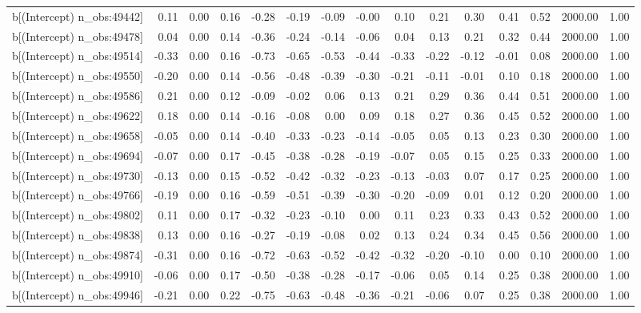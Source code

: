 \begin{table}[ht]
\begin{tabular}{rrrrrrrrrrrrrrr}
  b[(Intercept) n\_obs:49442] & 0.11 & 0.00 & 0.16 & -0.28 & -0.19 & -0.09 & -0.00 & 0.10 & 0.21 & 0.30 & 0.41 & 0.52 & 2000.00 & 1.00 \\ 
  b[(Intercept) n\_obs:49478] & 0.04 & 0.00 & 0.14 & -0.36 & -0.24 & -0.14 & -0.06 & 0.04 & 0.13 & 0.21 & 0.32 & 0.44 & 2000.00 & 1.00 \\ 
  b[(Intercept) n\_obs:49514] & -0.33 & 0.00 & 0.16 & -0.73 & -0.65 & -0.53 & -0.44 & -0.33 & -0.22 & -0.12 & -0.01 & 0.08 & 2000.00 & 1.00 \\ 
  b[(Intercept) n\_obs:49550] & -0.20 & 0.00 & 0.14 & -0.56 & -0.48 & -0.39 & -0.30 & -0.21 & -0.11 & -0.01 & 0.10 & 0.18 & 2000.00 & 1.00 \\ 
  b[(Intercept) n\_obs:49586] & 0.21 & 0.00 & 0.12 & -0.09 & -0.02 & 0.06 & 0.13 & 0.21 & 0.29 & 0.36 & 0.44 & 0.51 & 2000.00 & 1.00 \\ 
  b[(Intercept) n\_obs:49622] & 0.18 & 0.00 & 0.14 & -0.16 & -0.08 & 0.00 & 0.09 & 0.18 & 0.27 & 0.36 & 0.45 & 0.52 & 2000.00 & 1.00 \\ 
  b[(Intercept) n\_obs:49658] & -0.05 & 0.00 & 0.14 & -0.40 & -0.33 & -0.23 & -0.14 & -0.05 & 0.05 & 0.13 & 0.23 & 0.30 & 2000.00 & 1.00 \\ 
  b[(Intercept) n\_obs:49694] & -0.07 & 0.00 & 0.17 & -0.45 & -0.38 & -0.28 & -0.19 & -0.07 & 0.05 & 0.15 & 0.25 & 0.33 & 2000.00 & 1.00 \\ 
  b[(Intercept) n\_obs:49730] & -0.13 & 0.00 & 0.15 & -0.52 & -0.42 & -0.32 & -0.23 & -0.13 & -0.03 & 0.07 & 0.17 & 0.25 & 2000.00 & 1.00 \\ 
  b[(Intercept) n\_obs:49766] & -0.19 & 0.00 & 0.16 & -0.59 & -0.51 & -0.39 & -0.30 & -0.20 & -0.09 & 0.01 & 0.12 & 0.20 & 2000.00 & 1.00 \\ 
  b[(Intercept) n\_obs:49802] & 0.11 & 0.00 & 0.17 & -0.32 & -0.23 & -0.10 & 0.00 & 0.11 & 0.23 & 0.33 & 0.43 & 0.52 & 2000.00 & 1.00 \\ 
  b[(Intercept) n\_obs:49838] & 0.13 & 0.00 & 0.16 & -0.27 & -0.19 & -0.08 & 0.02 & 0.13 & 0.24 & 0.34 & 0.45 & 0.56 & 2000.00 & 1.00 \\ 
  b[(Intercept) n\_obs:49874] & -0.31 & 0.00 & 0.16 & -0.72 & -0.63 & -0.52 & -0.42 & -0.32 & -0.20 & -0.10 & 0.00 & 0.10 & 2000.00 & 1.00 \\ 
  b[(Intercept) n\_obs:49910] & -0.06 & 0.00 & 0.17 & -0.50 & -0.38 & -0.28 & -0.17 & -0.06 & 0.05 & 0.14 & 0.25 & 0.38 & 2000.00 & 1.00 \\ 
  b[(Intercept) n\_obs:49946] & -0.21 & 0.00 & 0.22 & -0.75 & -0.63 & -0.48 & -0.36 & -0.21 & -0.06 & 0.07 & 0.25 & 0.38 & 2000.00 & 1.00 \\ 

\end{tabular}
\end{table}

